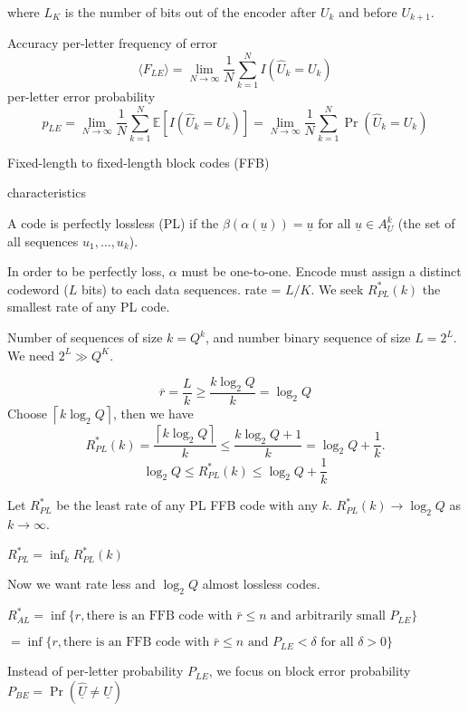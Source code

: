 \documentclass{report}
\theoremstyle{definition}
\theoremstyle{remark}
\numberwithin{equation}{section}
\begin{document}
  where $L_K$ is the number of bits out of the encoder after $U_k$ and before $U_{k+1}$.

Accuracy
per-letter frequency of error \[
  \langle F_{LE}\rangle = \lim_{N \to \infty} \frac{1}{N} \sum_{k=1}^N I(\hat{U}_k=U_k)
\]
per-letter error probability \[
  p_{LE} = \lim_{N \to \infty} \frac{1}{N} \sum_{k=1}^N \mathbb{E}[I(\hat{U}_k=U_k)] = \lim_{N \to \infty} \frac{1}{N} \sum_{k=1}^N \Pr(\hat{U}_k=U_k)
\]

Fixed-length to fixed-length block codes (FFB)


characteristics

A code is perfectly lossless (PL) if the $\beta(\alpha(\underline{u})) = \underline{u}$ for all $\underline{u} \in A_U^k$ (the set of all sequences $u_1, \ldots, u_k$).

In order to be perfectly loss, $\alpha$ must be one-to-one. Encode must assign a distinct codeword ($L$ bits) to each data sequences. rate = $L/K$.
We seek $R^*_{PL}(k)$ the smallest rate of any PL code.

Number of sequences of size $k = Q^k$, and number binary sequence of size $L = 2^L$. We need $2^L \gg Q^K$.

\[
\overline{r} = \frac{L}{k} \geq \frac{k\log_2Q}{k} = \log_2Q
\]
Choose $\left\lceil k\log_2Q\right\rceil$, then we have \[
  R^*_{PL}(k) = \frac{\left\lceil k\log_2Q\right\rceil}{k} \leq\frac{k\log_2Q + 1}{k} =\log_2 Q + \frac{1}{k}.
\]
\[
  \log_2 Q \leq R^*_{PL}(k) \leq \log_2 Q + \frac{1}{k}
\]

Let $R^*_{PL}$ be the least rate of any PL FFB code with any $k$. 
$R^*_{PL}(k) \to \log_2 Q$ as $k \to \infty$.

$R^*_{PL} = \inf_k R^*_{PL}(k)$

Now we want rate less and $\log_2 Q$ almost lossless codes.

$R^*_{AL} =  \inf \{r, \text{there is an FFB code with $\bar{r} \leq n$ and arbitrarily small $P_{LE}$}\}$

$ = \inf \{r, \text{there is an FFB code with $\bar{r} \leq n$ and $P_{LE} < \delta$ for all $\delta > 0$}\}$

Instead of per-letter probability $P_{LE}$, we focus on block error probability $P_{BE} = \Pr(\underline{\hat{U}} \neq \underline{U})$
\end{document}
